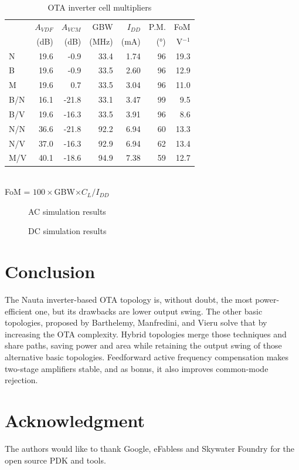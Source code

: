 \documentclass[conference]{IEEEtran}
\begin{document}
\begin{table}[htbp]
	\caption{OTA inverter cell multipliers}\label{table:ota:summary}
	\centering
	\begin{tabular}{l|r r r r r r }
		& $A_{VDF}$ & $A_{VCM}$ & GBW   & $I_{DD}$ & P.M. & FoM      \\
		& (dB)      & (dB)      & (MHz) & (mA)     & (°)  & V$^{-1}$ \\
		\hline
		N   & 19.6 &  -0.9 &  33.4 & 1.74 & 96 & 19.3 \\
		B   & 19.6 &  -0.9 &  33.5 & 2.60 & 96 & 12.9 \\
		M   & 19.6 &   0.7 &  33.5 & 3.04 & 96 & 11.0 \\
		B/N & 16.1 & -21.8 &  33.1 & 3.47 & 99 &  9.5 \\
		B/V & 19.6 & -16.3 &  33.5 & 3.91 & 96 &  8.6 \\
		N/N & 36.6 & -21.8 &  92.2 & 6.94 & 60 & 13.3 \\
		N/V & 37.0 & -16.3 &  92.9 & 6.94 & 62 & 13.4 \\
		M/V & 40.1 & -18.6 &  94.9 & 7.38 & 59 & 12.7 \\
	\end{tabular}
	\footnotesize{\\FoM = $100\times$GBW$\times C_L / I_{DD}$}
\end{table}

\begin{figure}[!htbp]
	
	\caption{AC simulation results}
	\label{fig:sim:ac}
\end{figure}

\begin{figure}[!htbp]
	
	\caption{DC simulation results}
	\label{fig:sim:dc}
\end{figure}

	\section{Conclusion}\label{section:conclusion}

The Nauta inverter-based OTA topology is, without doubt, the most power-efficient one, but its drawbacks are lower output swing. The other basic topologies, proposed by Barthelemy, Manfredini, and Vieru solve that by increasing the OTA complexity. Hybrid topologies merge those techniques and share paths, saving power and area while retaining the output swing of those alternative basic topologies. Feedforward active frequency compensation makes two-stage amplifiers stable, and as bonus, it also improves common-mode rejection.
		
	\section*{Acknowledgment}
	
The authors would like to thank Google, eFabless and Skywater Foundry for the open source PDK and tools.
	


	
	
	
	
\end{document}

